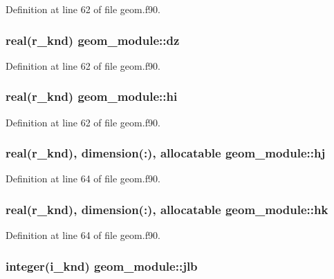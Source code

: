 Definition at line 62 of file geom.\-f90.

\hypertarget{classgeom__module_a59842db695f66127f749bffd9df2f034}{
\subsubsection[{dz}]{\setlength{\rightskip}{0pt plus 5cm}real(r\-\_\-knd) geom\-\_\-module\-::dz}}\label{classgeom__module_a59842db695f66127f749bffd9df2f034}


Definition at line 62 of file geom.\-f90.

\hypertarget{classgeom__module_af657687714307a2bfe5e99ea8ee9f35e}{
\subsubsection[{hi}]{\setlength{\rightskip}{0pt plus 5cm}real(r\-\_\-knd) geom\-\_\-module\-::hi}}\label{classgeom__module_af657687714307a2bfe5e99ea8ee9f35e}


Definition at line 62 of file geom.\-f90.

\hypertarget{classgeom__module_ad5db4c62807a7025e92dd2c5742156eb}{
\subsubsection[{hj}]{\setlength{\rightskip}{0pt plus 5cm}real(r\-\_\-knd), dimension(\-:), allocatable geom\-\_\-module\-::hj}}\label{classgeom__module_ad5db4c62807a7025e92dd2c5742156eb}


Definition at line 64 of file geom.\-f90.

\hypertarget{classgeom__module_a42bd1a5bffae9b223ac63ce018664023}{
\subsubsection[{hk}]{\setlength{\rightskip}{0pt plus 5cm}real(r\-\_\-knd), dimension(\-:), allocatable geom\-\_\-module\-::hk}}\label{classgeom__module_a42bd1a5bffae9b223ac63ce018664023}


Definition at line 64 of file geom.\-f90.

\hypertarget{classgeom__module_a87c8f8859d2d98c1dfc36f0ccf4208df}{
\subsubsection[{jlb}]{\setlength{\rightskip}{0pt plus 5cm}integer(i\-\_\-knd) geom\-\_\-module\-::jlb}}\label{classgeom__module_a87c8f8859d2d98c1dfc36f0ccf4208df}



